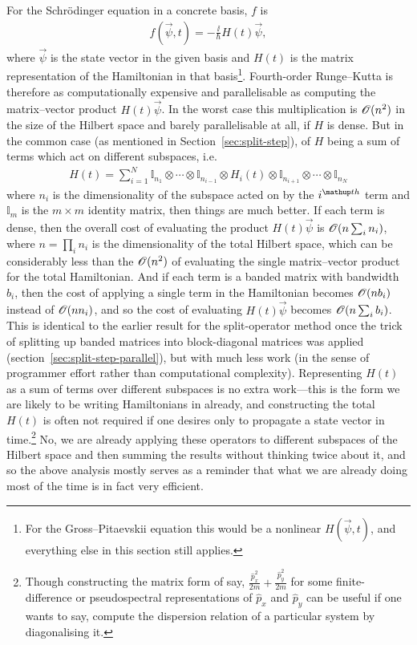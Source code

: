 For the Schr\"odinger equation in a concrete basis, $f$ is
\begin{align}
f(\vec \psi, t) = -\frac\ii\hbar H(t)\vec \psi,
\end{align}
where $\vec \psi$ is the state vector in the given basis and $H(t)$ is the matrix representation of the Hamiltonian in that basis\footnote{For the Gross--Pitaevskii equation this would be a nonlinear $H(\vec \psi, t)$, and everything else in this section still applies.}. Fourth-order Runge--Kutta is therefore as computationally expensive and parallelisable as computing the matrix--vector product $H(t)\vec\psi$. In the worst case this multiplication is $\mathscr{O}(n^2)$ in the size of the Hilbert space and barely parallelisable at all, if $H$ is dense. But in the common case (as mentioned in Section~\ref{sec:split-step}), of $H$ being a sum of terms which act on different subspaces, i.e.
\begin{align}
H(t) = \sum_{i=1}^N \mathbb{I}_{n_1} \otimes \cdots  \otimes \mathbb{I}_{n_{i-1}}
\otimes  H_i(t) \otimes  
 \mathbb{I}_{n_{i+1}} \otimes \cdots \otimes \mathbb{I}_{n_N}
\end{align}
where $n_i$ is the dimensionality of the subspace acted on by the $i^\up{th}$ term and $\mathbb{I}_m$ is the $m\times m$ identity matrix, then things are much better. If each term is dense, then the overall cost of evaluating the product $H(t)\vec\psi$ is $\mathscr{O}(n\sum_i n_i)$, where $n = \prod_i n_i$ is the dimensionality of the total Hilbert space, which can be considerably less than the $\mathscr{O}(n^2)$ of evaluating the single  matrix--vector product for the total Hamiltonian. And if each term is a banded matrix with bandwidth $b_i$, then the cost of applying a single term in the Hamiltonian becomes $\mathscr{O}(n b_i)$ instead of $\mathscr{O}(n n_i)$, and so the cost of evaluating $H(t)\vec\psi$ becomes $\mathscr{O}(n\sum_i b_i)$. This is identical to the earlier result for the split-operator method once the trick of splitting up banded matrices into block-diagonal matrices was applied (section~\ref{sec:split-step-parallel}), but with much less work (in the sense of programmer effort rather than computational complexity). Representing $H(t)$ as a sum of terms over different subspaces is no extra work---this is the form we are likely to be writing Hamiltonians in already, and constructing the total $H(t)$ is often not required if one desires only to propagate a state vector in time.\footnote{Though constructing the matrix form of say, $\frac {\hat p_x^2} {2m} + \frac {\hat p_y^2} {2m}$ for some finite-difference or pseudospectral representations of $\hat p_x$ and $\hat p_y$ can be useful if one wants to say, compute the dispersion relation of a particular system by diagonalising it.} No, we are already applying these operators to different subspaces of the Hilbert space and then summing the results without thinking twice about it, and so the above analysis mostly serves as a reminder that what we are already doing most of the time is in fact very efficient. 

